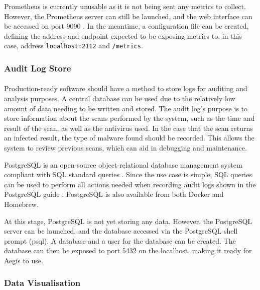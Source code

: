 \documentclass[12pt, conference, final, a4paper, onecolumn, compsoc]{IEEEtran}
\begin{document}
Prometheus is currently unusable as it is not being sent any metrics to collect.
However, the Prometheus server can still be launched, and the web interface can
be accessed on port 9090 \citep{prom-docs}. In the meantime, a configuration
file can be created, defining the address and endpoint expected to be exposing
metrics to, in this case, address \texttt{localhost:2112} and \texttt{/metrics}.

\subsubsection*{Audit Log Store}
\paragraph{}

Production-ready software should have a method to store logs for auditing and
analysis purposes. A central database can be used due to the relatively low
amount of data needing to be written and stored. The audit log's purpose is to
store information about the scans performed by the system, such as the time and
result of the scan, as well as the antivirus used. In the case that the scan
returns an infected result, the type of malware found should be recorded. This
allows the system to review previous scans, which can aid in debugging and
maintenance.

PostgreSQL is an open-source object-relational database management system
compliant with SQL standard queries \citep{postgresql}. Since the use case is
simple, SQL queries can be used to perform all actions needed when recording
audit logs shown in the PostgreSQL guide \citep{psql-guide}. PostgreSQL is also
available from both Docker and Homebrew.

At this stage, PostgreSQL is not yet storing any data. However, the PostgreSQL
server can be launched, and the database accessed via the PostgreSQL shell
prompt (psql). A database and a user for the database can be created. The
database can then be exposed to port 5432 on the localhost, making it ready for
Aegis to use.

\subsubsection*{Data Visualisation}
\paragraph{}
\end{document}
